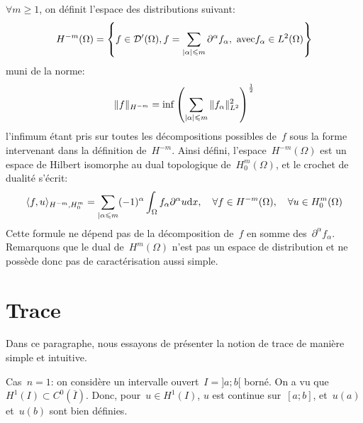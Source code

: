 $\forall m\ge 1$, on définit l'espace des distributions suivant:
\begin{equation}
H^{-m}(\Omega) =\left\{
f\in \mathcal{D}'(\Omega), f=\displaystyle\sum_{|\alpha|\leqslant m} \partial^\alpha f_\alpha,
\text{ avec} f_\alpha\in L^2(\Omega)
\right\}
\end{equation}
muni de la norme:
\begin{equation}
\|f\|_{H^{-m}} = \inf \left( \displaystyle\sum_{|\alpha|\leqslant m} \|f_\alpha\|^2_{L^2} \right)^{1\over2}
\end{equation}
l'infimum étant pris sur toutes les décompositions possibles de~$f$ sous la forme intervenant
dans la définition de~$H^{-m}$.
\medskipvm
Ainsi défini, l'espace~$H^{-m}(\Omega)$ est un espace de Hilbert isomorphe au dual
topologique de~$H^m_0(\Omega)$, et le crochet de dualité s'écrit:
\begin{equation}
\langle f,u\rangle_{H^{-m},H_0^m} = \displaystyle\sum_{|\alpha\leqslant m} (-1)^\alpha \displaystyle\int_\Omega
f_\alpha \partial^\alpha u \text{d} x,
\quad \forall f\in H^{-m}(\Omega),\quad \forall u\in H^m_0(\Omega)
\end{equation}
Cette formule ne dépend pas de la décomposition de~$f$ en somme des~$\partial^\alpha f_\alpha$.
\medskipvm
Remarquons que le dual de~$H^m(\Omega)$ n'est pas un espace de distribution et ne possède
donc pas de caractérisation aussi simple.

\medskip
\section{Trace}
Dans ce paragraphe, nous essayons de présenter la notion de trace de manière simple et intuitive.

\medskip
{}

\medskip
Cas~$n=1$:
on considère un intervalle ouvert~$I =]a;b[$ borné. On a vu que~$H^1(I)\subset C^0(\overline{I})$.
Donc, pour~$u\in H^1(I)$, $u$ est continue sur~$[a;b]$, et~$u(a)$ et~$u(b)$ sont bien définies.

